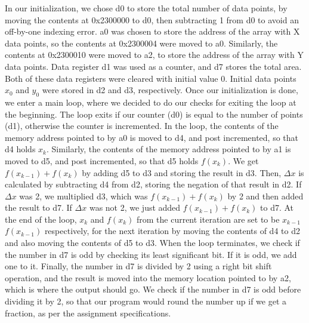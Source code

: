 \documentclass[letterpaper]{article}
\begin{document}
    In our initialization, we chose d0 to store the total number of data points,
    by moving the contents at 0x2300000 to d0, then subtracting 1 from d0 to
    avoid an off-by-one indexing error. a0 was chosen to store the address of
    the array with X data points, so the contents at 0x2300004 were moved to a0.
    Similarly, the contents at 0x2300010 were moved to a2, to store the address
    of the array with Y data points. Data register d1 was used as a counter, and
    d7 stores the total area. Both of these data registers were cleared with
    initial value 0. Initial data points $x_0$ and $y_0$ were stored in d2 and
    d3, respectively. Once our initialization is done, we enter a main loop,
    where we decided to do our checks for exiting the loop at the beginning. The
    loop exits if our counter (d0) is equal to the number of points (d1),
    otherwise the counter is incremented. In the loop, the contents of the
    memory address pointed to by a0 is moved to d4, and post incremented, so
    that d4 holds $x_k$. Similarly, the contents of the memory address pointed
    to by a1 is moved to d5, and post incremented, so that d5 holds $f(x_k)$. We
    get $f(x_{k-1})+f(x_k)$ by adding d5 to d3 and storing the result in d3.
    Then, $\Delta x$ is calculated by subtracting d4 from d2, storing the
    negation of that result in d2. If $\Delta x$ was 2, we multiplied d3, which
    was $f(x_{k-1})+f(x_k)$ by 2 and then added the result to d7. If $\Delta x$
    was not 2, we just added $f(x_{k-1})+f(x_k)$ to d7. At the end of the loop,
    $x_k$ and $f(x_k)$ from the current iteration are set to be $x_{k-1}$
    $f(x_{k-1})$ respectively, for the next iteration by moving the contents of
    d4 to d2 and also moving the contents of d5 to d3. When the loop terminates,
    we check if the number in d7 is odd by checking its least significant bit.
    If it is odd, we add one to it. Finally, the number in d7 is divided by 2
    using a right bit shift operation, and the result is moved into the memory
    location pointed to by a2, which is where the output should go. We check if
    the number in d7 is odd before dividing it by 2, so that our program would
    round the number up if we get a fraction, as per the assignment
    specifications.

\end{document}
